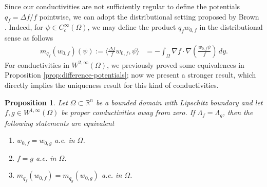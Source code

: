 \documentclass[12pt]{article}
\newtheorem{proposition}[theorem]{Proposition}
\begin{document}
Since our conductivities are not sufficiently regular to define the potentials $q_f=\Delta f/f$ pointwise, we can adopt the distributional setting proposed by Brown \cite{Brown-1996}. Indeed, for $\psi\in C_c^{\infty}(\Omega)$, we may define the product $q_f w_{0,f}$ in the distributional sense as follows
\begin{align}\label{eq:weak-product}
    m_{q_f}(w_{0,f})(\psi):=\Biggl\langle \frac{\Delta f}{f} w_{0,f}, \psi \Biggr\rangle&=-\int_{\Omega} \nabla f\cdot \nabla\left(\frac{w_{0,f}\psi}{f}\right)\, dy.
\end{align}
For conductivities in $W^{2,\infty}(\Omega)$, we previously proved some equivalences in Proposition \ref{prop:difference-potentials}; now we present a stronger result, which directly implies the uniqueness result for this kind of conductivities.
\begin{proposition}\label{prop:equivalences}
    Let $\Omega\subset \mathbb{R}^n$ be a bounded domain with Lipschitz boundary and let $f, g\in W^{1,\infty}(\Omega)$ be proper conductivities away from zero. If $\Lambda_f=\Lambda_g$, then the following statements are equivalent
\begin{enumerate}
    \item[(i)]  $w_{0,f}=w_{0,g}$ a.e. in $\Omega$.
     \item[(ii)] $f=g$ a.e. in $\Omega$.
     \item[(iii)] $m_{q_f}(w_{0,f})=m_{q_g}(w_{0,g})$ a.e. in $\Omega$.
\end{enumerate} 
\end{proposition}
\end{document}
